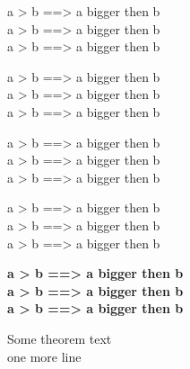 \documentclass[12pt]{article}
\begin{document}
\begin{Theorem}{}


    \begin{tcbraster}[raster columns=2,raster halign=right]
        \begin{tbox}[colorTheorem][0cm][2pt][10]
            \centering
            a > b ==> a bigger then b\\
            a > b ==> a bigger then b\\
            a > b ==> a bigger then b
        \end{tbox}
        \begin{tbox}[colorTheorem][0cm][2pt][10]
            \centering
            a > b ==> a bigger then b\\
            a > b ==> a bigger then b\\
            a > b ==> a bigger then b
        \end{tbox}
        \begin{tbox}[colorTheorem][0cm][2pt][10]
            \centering
            a > b ==> a bigger then b\\
            a > b ==> a bigger then b\\
            a > b ==> a bigger then b
        \end{tbox}
    \end{tcbraster}

    \begin{tbox}[colorTheorem][0cm][2pt][10]
        \centering
        a > b ==> a bigger then b\\
        a > b ==> a bigger then b\\
        a > b ==> a bigger then b
    \end{tbox}

    \begin{tbox}[colorTheorem][0cm][2pt][10]
        \centering
        \textbf{%
            a > b ==> a bigger then b\\
            a > b ==> a bigger then b\\
            a > b ==> a bigger then b
        }
    \end{tbox}

    \begin{TheoremProof}{}
        Some theorem text\\
        one more line
    \end{TheoremProof}
    
\end{Theorem}
\end{document}
